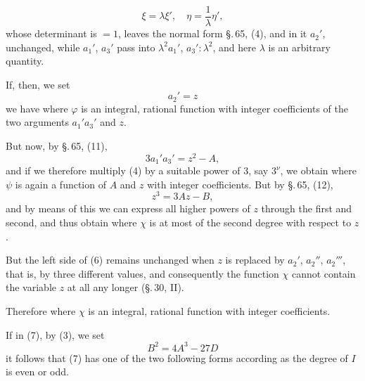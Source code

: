 \[
\xi = \lambda\xi', \quad \eta = \frac{1}{\lambda}\eta',
\]
whose determinant is $= 1$, leaves the normal form \S.\,65, (4), and in it
$a_2'$, unchanged, while $a_1'$, $a_3'$ pass into $\lambda^2 a_1'$, $a_3' : \lambda^2$,
and here $\lambda$ is an arbitrary quantity.

If, then, we set
\[
a_2' = z
\]
we have
where $\varphi$ is an integral, rational function with integer coefficients of the two
arguments $a_1'a_3'$ and $z$.

But now, by \S.\,65, (11),
\[
3a_1'a_3' = z^2 - A,
\]
and if we therefore multiply (4) by a suitable power of 3, say $3^\nu$,
we obtain
where $\psi$ is again a function of $A$ and $z$ with integer coefficients. But by
\S.\,65, (12),
\[
z^3 = 3Az - B,
\]
and by means of this we can express all higher powers of $z$ through the first and
second, and thus obtain
where $\chi$ is at most of the second degree with respect to $z$.

But the left side of (6) remains unchanged when $z$ is replaced by $a_2'$,
$a_2''$, $a_2'''$, that is, by three different values, and
consequently the function $\chi$ cannot contain the variable $z$ at all any longer
(\S.\,30, II).

Therefore
where $\chi$ is an integral, rational function with integer coefficients.

If in (7), by (3), we set
\[
B^2 = 4A^3 - 27 D
\]
it follows that (7) has one of the two following forms
according as the degree of $I$ is even or odd.
